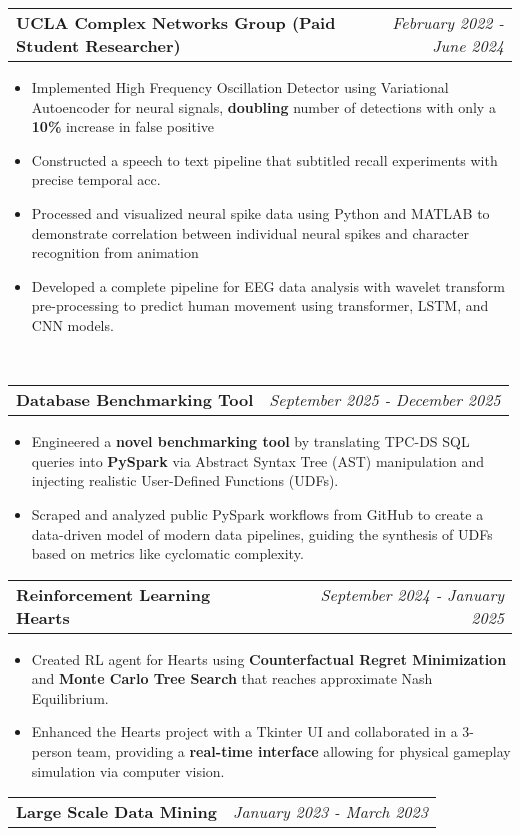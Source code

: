 \documentclass[letterpaper,11pt]{article}
\makeatletter
\newcommand{\resitem}[1]{\item #1 \vspace{-8pt}}
\newcommand{\resheading}[1]{\vspace{8pt}{\Large \textbf{#1}}\\\vspace{-8pt}\hrulefill}
\newcommand{\ressubheadingsmol}[2]{\vspace{1pt}
\begin{tabular*}{7.0in}{l@{\cftdotfill{\cftsecdotsep}\extracolsep{\fill}}r}
		\textbf{#1} & \textit{#2} \\
\end{tabular*}\vspace{-6pt}}
\makeatother
\begin{document}
\ressubheadingsmol{UCLA Complex Networks Group (Paid Student Researcher)}{February 2022 - June 2024}
\begin{itemize}
    \resitem{Implemented High Frequency Oscillation Detector using Variational Autoencoder for neural signals, \textbf{doubling} number of detections with only a \textbf{10\%} increase in false positive}
    \resitem{Constructed a speech to text pipeline that subtitled recall experiments with precise temporal acc.}
    \resitem{Processed and visualized neural spike data using Python and MATLAB to demonstrate correlation between individual neural spikes and character recognition from animation}
    \resitem{Developed a complete pipeline for EEG data analysis with wavelet transform pre-processing to predict human movement using transformer, LSTM, and CNN models.}

\end{itemize}


\resheading{Projects}
\ressubheadingsmol{Database Benchmarking Tool}{September 2025 - December 2025}
\begin{itemize}
    \resitem{Engineered a\textbf{ novel benchmarking tool} by translating TPC-DS SQL queries into \textbf{PySpark} via Abstract Syntax Tree (AST) manipulation and injecting realistic User-Defined Functions (UDFs).}
    \resitem{Scraped and analyzed public PySpark workflows from GitHub to create a data-driven model of modern data pipelines, guiding the synthesis of UDFs based on metrics like cyclomatic complexity.}
\end{itemize}
\ressubheadingsmol{Reinforcement Learning Hearts}{September 2024 - January 2025}
\begin{itemize}
    \resitem{Created RL agent for Hearts using \textbf{Counterfactual Regret Minimization} and \textbf{Monte Carlo Tree Search} that reaches approximate Nash Equilibrium.}
    \resitem{Enhanced the Hearts project with a Tkinter UI and collaborated in a 3-person team, providing a \textbf{real-time interface} allowing for physical gameplay simulation via computer vision.}
\end{itemize}


\ressubheadingsmol{Large Scale Data Mining}{January 2023 - March 2023}
\end{document}
